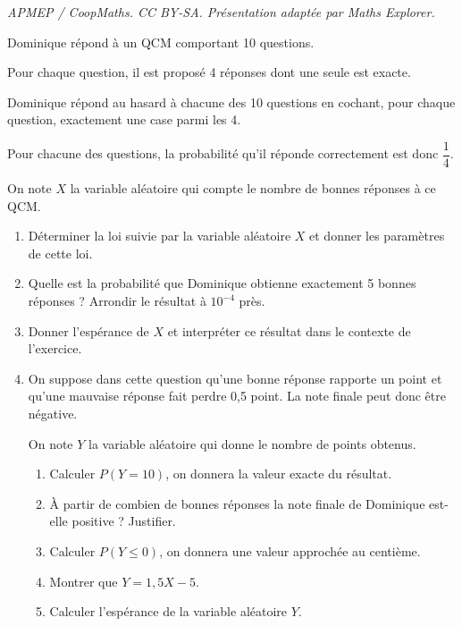 \documentclass[10pt]{article}
\begin{document}
\noindent\textit{APMEP / CoopMaths. CC BY-SA. Présentation adaptée par Maths Explorer.}\par\medskip
Dominique répond à un QCM comportant 10 questions.

Pour chaque question, il est proposé 4 réponses dont une seule est exacte.

Dominique répond au hasard à chacune des 10 questions en cochant, pour chaque question, exactement une case parmi les 4.

Pour chacune des questions, la probabilité qu'il réponde correctement est donc $\dfrac{1}{4}$.

On note $X$ la variable aléatoire qui compte le nombre de bonnes réponses à ce QCM.

\begin{enumerate}
\item Déterminer la loi suivie par la variable aléatoire $X$ et donner les paramètres de cette loi.

\item Quelle est la probabilité que Dominique obtienne exactement 5 bonnes réponses ? Arrondir le résultat à $10^{-4}$ près.

\item Donner l'espérance de $X$ et interpréter ce résultat dans le contexte de l'exercice.

\item On suppose dans cette question qu'une bonne réponse rapporte un point et qu'une mauvaise réponse fait perdre 0,5 point. La note finale peut donc être négative.

On note $Y$ la variable aléatoire qui donne le nombre de points obtenus.

	\begin{enumerate}
		\item Calculer $P(Y=10)$, on donnera la valeur exacte du résultat.

		\item À partir de combien de bonnes réponses la note finale de Dominique est-elle positive ? Justifier.

		\item Calculer $P(Y \leqslant 0)$, on donnera une valeur approchée au centième.

		\item Montrer que $Y=1,5 X-5$.

		\item Calculer l'espérance de la variable aléatoire $Y$.
	\end{enumerate}
\end{enumerate}
\end{document}
